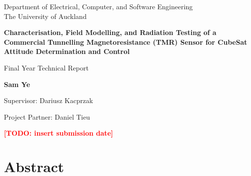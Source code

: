 \documentclass[12pt,a4paper]{article}
\newcommand{\todo}[1]{\textcolor{red}{\textbf{[TODO: #1]}}}
\begin{document}
\begin{titlepage}
\centering
\vspace*{1.5cm}
{\large Department of Electrical, Computer, and Software Engineering \\ The University of Auckland \par}
\vspace{2.5cm}
{\Huge\bfseries Characterisation, Field Modelling, and Radiation Testing of a Commercial Tunnelling Magnetoresistance (TMR) Sensor for CubeSat Attitude Determination and Control \par}
\vspace{2cm}
{\Large Final Year Technical Report \par}
\vspace{2.5cm}
{\large\bfseries Sam Ye \par}
\vspace{0.6cm}
{\large Supervisor: Dariusz Kacprzak \par}
\vspace{0.2cm}
{\large Project Partner: Daniel Tieu \par}
\vfill
{\large \todo{insert submission date} \par}
\end{titlepage}


\clearpage


\setcounter{page}{2}
\section*{Abstract}
\end{document}
